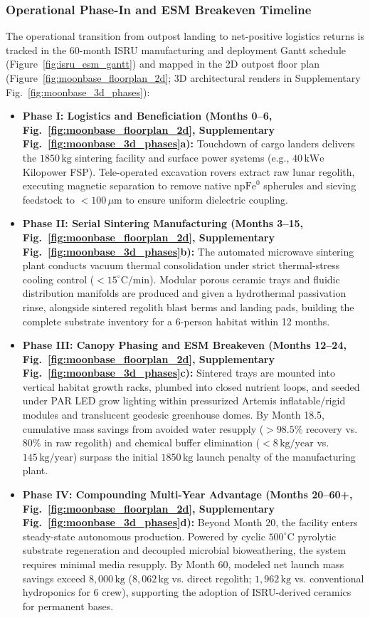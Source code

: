 \subsubsection{Operational Phase-In and ESM Breakeven Timeline}
The operational transition from outpost landing to net-positive logistics returns is tracked in the 60-month ISRU manufacturing and deployment Gantt schedule (Figure~\ref{fig:isru_esm_gantt}) and mapped in the 2D outpost floor plan (Figure~\ref{fig:moonbase_floorplan_2d}; 3D architectural renders in Supplementary Fig.~\ref{fig:moonbase_3d_phases}):
\begin{itemize}
    \item \textbf{Phase I: Logistics and Beneficiation (Months 0--6, Fig.~\ref{fig:moonbase_floorplan_2d}, Supplementary Fig.~\ref{fig:moonbase_3d_phases}a):} Touchdown of cargo landers delivers the $1850\,\mathrm{kg}$ sintering facility and surface power systems (e.g., $40\,\mathrm{kWe}$ Kilopower FSP). Tele-operated excavation rovers extract raw lunar regolith, executing magnetic separation to remove native $\mathrm{npFe}^0$ spherules and sieving feedstock to $<100\,\mu\mathrm{m}$ to ensure uniform dielectric coupling.
    \item \textbf{Phase II: Serial Sintering Manufacturing (Months 3--15, Fig.~\ref{fig:moonbase_floorplan_2d}, Supplementary Fig.~\ref{fig:moonbase_3d_phases}b):} The automated microwave sintering plant conducts vacuum thermal consolidation under strict thermal-stress cooling control ($<15^\circ\mathrm{C/min}$). Modular porous ceramic trays and fluidic distribution manifolds are produced and given a hydrothermal passivation rinse, alongside sintered regolith blast berms and landing pads, building the complete substrate inventory for a 6-person habitat within 12 months.
    \item \textbf{Phase III: Canopy Phasing and ESM Breakeven (Months 12--24, Fig.~\ref{fig:moonbase_floorplan_2d}, Supplementary Fig.~\ref{fig:moonbase_3d_phases}c):} Sintered trays are mounted into vertical habitat growth racks, plumbed into closed nutrient loops, and seeded under PAR LED grow lighting within pressurized Artemis inflatable/rigid modules and translucent geodesic greenhouse domes. By Month 18.5, cumulative mass savings from avoided water resupply ($>98.5\%$ recovery vs. $80\%$ in raw regolith) and chemical buffer elimination ($<8\,\mathrm{kg/year}$ vs. $145\,\mathrm{kg/year}$) surpass the initial $1850\,\mathrm{kg}$ launch penalty of the manufacturing plant.
    \item \textbf{Phase IV: Compounding Multi-Year Advantage (Months 20--60+, Fig.~\ref{fig:moonbase_floorplan_2d}, Supplementary Fig.~\ref{fig:moonbase_3d_phases}d):} Beyond Month 20, the facility enters steady-state autonomous production. Powered by cyclic $500^\circ\mathrm{C}$ pyrolytic substrate regeneration and decoupled microbial bioweathering, the system requires minimal media resupply. By Month 60, modeled net launch mass savings exceed $8{,}000\,\mathrm{kg}$ ($8{,}062\,\mathrm{kg}$ vs. direct regolith; $1{,}962\,\mathrm{kg}$ vs. conventional hydroponics for 6 crew), supporting the adoption of ISRU-derived ceramics for permanent bases.
\end{itemize}

